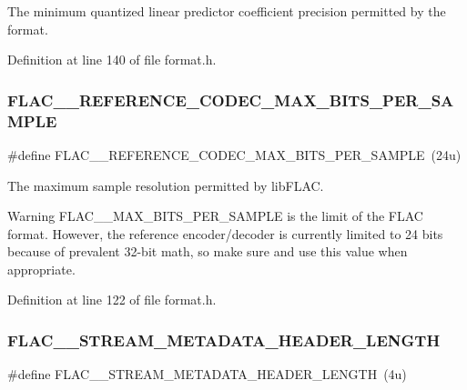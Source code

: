 The minimum quantized linear predictor coefficient precision permitted by the format. 

Definition at line 140 of file format.\+h.

\mbox{\label{group__flac__format_ga0fc418d96053d385fd2f56dce8007fbc}} 
\subsubsection{\texorpdfstring{FLAC\_\_REFERENCE\_CODEC\_MAX\_BITS\_PER\_SAMPLE}{FLAC\_\_REFERENCE\_CODEC\_MAX\_BITS\_PER\_SAMPLE}}
{\footnotesize\ttfamily \#define F\+L\+A\+C\+\_\+\+\_\+\+R\+E\+F\+E\+R\+E\+N\+C\+E\+\_\+\+C\+O\+D\+E\+C\+\_\+\+M\+A\+X\+\_\+\+B\+I\+T\+S\+\_\+\+P\+E\+R\+\_\+\+S\+A\+M\+P\+LE~(24u)}

The maximum sample resolution permitted by lib\+F\+L\+AC.

\begin{DoxyWarning}{Warning}
F\+L\+A\+C\+\_\+\+\_\+\+M\+A\+X\+\_\+\+B\+I\+T\+S\+\_\+\+P\+E\+R\+\_\+\+S\+A\+M\+P\+LE is the limit of the F\+L\+AC format. However, the reference encoder/decoder is currently limited to 24 bits because of prevalent 32-\/bit math, so make sure and use this value when appropriate. 
\end{DoxyWarning}


Definition at line 122 of file format.\+h.

\mbox{\label{group__flac__format_ga706a29b8a14902c457783bfd4fd7bab2}} 
\subsubsection{\texorpdfstring{FLAC\_\_STREAM\_METADATA\_HEADER\_LENGTH}{FLAC\_\_STREAM\_METADATA\_HEADER\_LENGTH}}
{\footnotesize\ttfamily \#define F\+L\+A\+C\+\_\+\+\_\+\+S\+T\+R\+E\+A\+M\+\_\+\+M\+E\+T\+A\+D\+A\+T\+A\+\_\+\+H\+E\+A\+D\+E\+R\+\_\+\+L\+E\+N\+G\+TH~(4u)}

